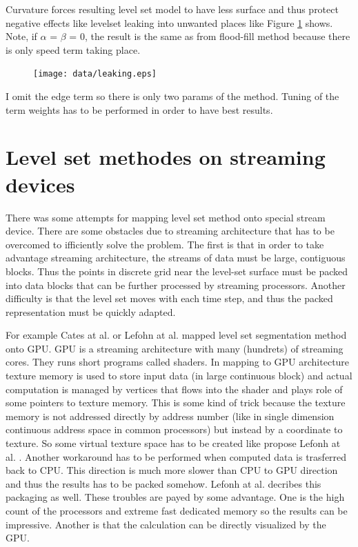 Curvature forces resulting level set model to have less surface and thus protect negative effects like levelset leaking into unwanted places like Figure \ref{fg:leaking} shows. Note, if $\alpha$ = $\beta$ = 0, the result is the same as from flood-fill method because there is only speed term taking place.

\begin{figure}
    \centering
    \texttt{[image: data/leaking.eps]}
    \caption[Leaking of segmentaion into unwanted places]{}
    \label{fg:leaking}
\end{figure}

I omit the edge term so there is only two params of the method. Tuning of the term weights has to be performed in order to have best results.

\section{Level set methodes on streaming devices}

\par
There was some attempts for mapping level set method onto special stream device. There are some obstacles due to streaming architecture that has to be overcomed to ifficiently solve the problem. The ﬁrst is that in order to take advantage streaming architecture, the streams of data must be large, contiguous blocks. Thus the points in discrete grid near the level-set surface must be packed into data blocks that can be further processed by streaming processors. Another difficulty is that the level set moves with each time step, and thus the packed representation must be quickly adapted.

\par
For example Cates at al. \cite{GIST} or Lefohn at al. \cite{lefonhGPUSolver} mapped level set segmentation method onto GPU. GPU is a streaming architecture with many (hundrets) of streaming cores. They runs short programs called shaders. In mapping to GPU architecture texture memory is used to store input data (in large continuous block) and actual computation is managed by vertices that flows into the shader and plays role of some pointers to texture memory. This is some kind of trick because the texture memory is not addressed directly by address number (like in single dimension continuous address space in common processors) but instead by a coordinate to texture. So some virtual texture space has to be created like propose Lefonh at al. \cite{lefonhGPUSolver}. Another workaround has to be performed when computed data is trasferred back to CPU. This direction is much more slower than CPU to GPU direction and thus the results has to be packed somehow. Lefonh at al. \cite{lefonhGPUSolver} decribes this packaging as well. These troubles are payed by some advantage. One is the high count of the processors and extreme fast dedicated memory so the results can be impressive. Another is that the calculation can be directly visualized by the GPU.

